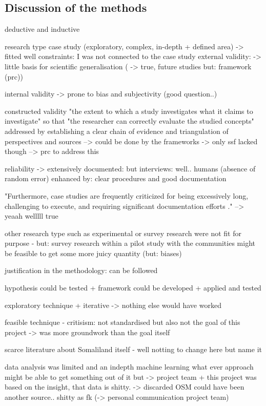 \subsection{Discussion of the methods}

deductive and inductive

research type case study (exploratory, complex, in-depth + defined area) -> fitted well
constraints: I was not connected to the case study
external validity: -> little basis for scientific generalisation (\autocites{yinCaseStudyResearch1984}[5]{zainalCaseStudyResearch2007} -> true, future studies but: framework (prc))

internal validity -> prone to bias and subjectivity (good question..)

constructed validity "the extent to which a study investigates what it claims to investigate" \autocite[3]{gibbertWhatPassesRigorous2008} so that "the researcher can correctly evaluate the studied concepts" \autocite[277]{ferreiraHowImproveValidity2020}
addressed by establishing a clear chain of evidence and triangulation of perspectives and sources --> could be done by the frameworks -> only ssf lacked though --> prc to address this


reliability -> extensively documented: but interviews: well.. humans (absence of random error)
enhanced by: clear procedures and good documentation

"Furthermore, case studies are frequently criticized for being excessively long, challenging to execute, and requiring significant documentation efforts \autocite{yinCaseStudyResearch1984}."
--> yeaah welllll true

other research type such as experimental or survey research were not fit for purpose - but: survey research within a pilot study with the communities might be feasible to get some more juicy quantity (but: biases)

justification in the methodology: can be followed

hypothesis could be tested + framework could be developed + applied and tested


exploratory technique + iterative -> nothing else would have worked

feasible technique - critisism: not standardised but also not the goal of this project -> was more groundwork than the goal itself

scarce literature about Somaliland itself - well notting to change here but name it

data analysis was limited and an indepth machine learning what ever approach might be able to get something out of it but -> project team + this project was based on the insight, that data is shitty. -> discarded
OSM could have been another source.. shitty as fk (-> personal communication project team)

